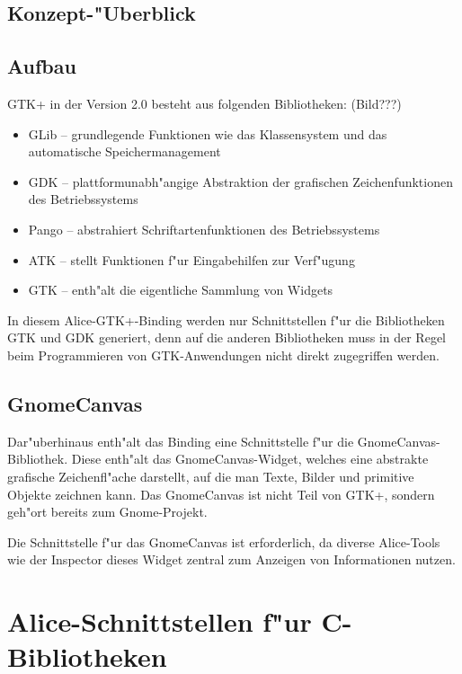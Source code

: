 \documentclass{article}
\begin{document}
\subsection{Konzept-"Uberblick}

\subsection{Aufbau}

GTK+ in der Version 2.0 besteht aus folgenden Bibliotheken: (Bild???)

\begin{itemize}
\item GLib -- grundlegende Funktionen wie das Klassensystem und
      das automatische Speichermanagement
\item GDK -- plattformunabh"angige Abstraktion der grafischen
      Zeichenfunktionen des Betriebssystems
\item Pango -- abstrahiert Schriftartenfunktionen des Betriebssystems
\item ATK -- stellt Funktionen f"ur Eingabehilfen zur Verf"ugung
\item GTK -- enth"alt die eigentliche Sammlung von Widgets
\end{itemize}

In diesem Alice-GTK+-Binding werden nur Schnittstellen f"ur die Bibliotheken
GTK und GDK generiert, denn auf die anderen Bibliotheken muss in der Regel beim
Programmieren von GTK-Anwendungen nicht direkt zugegriffen werden.

\subsection{GnomeCanvas}

Dar"uberhinaus enth"alt das Binding eine Schnittstelle f"ur die GnomeCanvas-
Bibliothek. Diese enth"alt das GnomeCanvas-Widget, welches eine abstrakte
grafische Zeichenfl"ache darstellt, auf die man Texte, Bilder und primitive
Objekte zeichnen kann. Das GnomeCanvas ist nicht Teil von GTK+, sondern
geh"ort bereits zum Gnome-Projekt.

Die Schnittstelle f"ur das GnomeCanvas ist erforderlich, da diverse Alice-Tools
wie der Inspector dieses Widget zentral zum Anzeigen von Informationen
nutzen.

\section{Alice-Schnittstellen f"ur C-Bibliotheken}
\end{document}
